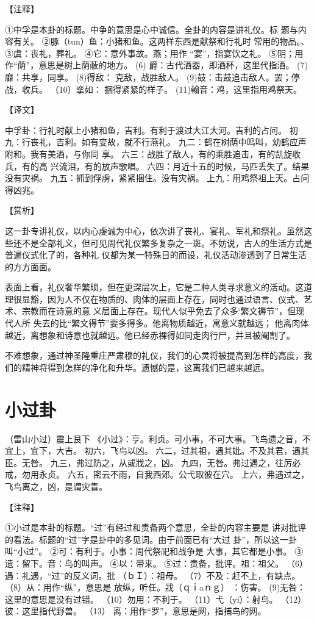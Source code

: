 \documentclass[12pt,UTF8]{ctexbook}
\begin{document}
【注释】

①中孚是本卦的标题。中争的意思是心中诚信。全卦的内容是讲礼仪。标 题与内容有关。
②豚（tun）鱼：小猪和鱼。这两样东西是献祭和行礼时 常用的物品。、
③虞：丧礼，葬礼。
④它：意外事故。燕；用作 “宴”，指宴饮之礼。
⑤阴；用作“荫”，意思是树上荫蔽的地方。
(6) 爵：古代酒器，即酒杯，这里代指酒。
(7)靡：共享，同享。
(8)得敌： 克敌，战胜敌人。
(9)鼓：击鼓追击敌人。罢；停战，收兵。
（10）挛如： 捆得紧紧的样子。
(11)翰音：鸡，这里指用鸡祭天。

【译文】

中孚卦：行礼时献上小猪和鱼，吉利。有利于渡过大江大河。吉利的占问。
初九：行丧礼，吉利。如有变故，就不行燕礼。
九二：鹤在树荫中鸣叫，幼鹤应声附和。我有美酒，与你同 享。
六三：战胜了敌人，有的乘胜追击，有的凯旋收兵，有的高 兴流泪，有的放声歌唱。
六四：月近十五的时候，马匹丢失了。结果没有灾祸。
九五：抓到俘虏，紧紧捆住。没有灾祸。
上九：用鸡祭祖上天。占问得凶兆。

【赏析】

这一卦专讲礼仪，以内心虔诚为中心，依次讲了丧礼、宴礼、军礼和祭礼。虽然这些还不是全部礼义，但可见周代礼仪繁多复杂之一斑。不妨说，古人的生活方式是普遍仪式化了的，各种礼 仪都为某一特殊目的而设，礼仪活动渗透到了日常生活的方方面面。

表面上看，礼仪奢华繁琐，但在更深层次上，它是二种人类寻求意义的活动。这道理很显豁，因为人不仅在物质的、肉体的层面上存在，同时也通过语言、仪式、艺术、宗教而在诗意的意 义层面上存在。现代人似乎免去了众多‘繁文褥节”，但现代人所 失去的比“繁文得节”要多得多。他离物质越近，寓意义就越远； 他离肉体越近，离想象和诗意也就越远。他已经赤裸得如同走肉行尸，并且被阉割了。

不难想象，通过神圣隆重庄严肃穆的礼仪，我们的心灵将被提高到怎样的高度，我们的精神将得到怎样的净化和升华。遗憾的是，这离我们已越来越远。

\chapter{小过卦}

（雷山小过）震上艮下
《小过》：亨。利贞。可小事，不可大事。飞鸟遗之音，不宜上，宜下，大吉。
初六，飞鸟以凶。
六二，过其祖，遇其妣。不及其君，遇其臣。无咎。
九三，弗过防之，从或戕之，凶。
九四，无咎。弗过遇之，往厉必戒，勿用永贞。
六五，密云不雨，自我西郊。公弋取彼在穴。
上六，弗遇过之，飞鸟离之，凶，是谓灾眚。

【注释】

①小过是本卦的标题。“过”有经过和责备两个意思，全卦的内容主要是 讲对批评的看法。标题的“过”字是卦中的多见词。由于前面已有“大过 卦”，所以这一卦叫“小过”。
②可：有利于。小事：周代祭祀和战争是 大事，其它都是小事。
③遗：留下。音：鸟的叫声。
④以：带来。
⑤过：责备，批评。祖：祖父。
（6）遇：礼遇，“过”的反义词。批 （ｂＩ）：祖母。
（7）不及：赶不上，有缺点。
（8）从：用作“纵”，意思是 放纵，听任。戕（ｑｉaｎｇ） ：伤害。
(9)无咎：这里的意思是没有过错。
（10）勿用：不利于。
（11）弋（yi）：射鸟。
（12）彼：这里指代野兽。
（13） 离：用作“罗”，意思是网，指捕鸟的网。
\end{document}
